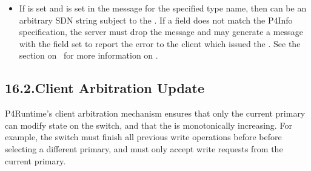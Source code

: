 \documentclass[11pt]{article}
\begin{document}
{\begin{itemize}
\begin{itemize}[noitemsep,topsep=\mdcompacttopsep]
\item{}If  is set and
 is set in the
 message for the specified type name, then
 can be an arbitrary SDN string subject to the
.
If a  field
does not match the P4Info specification, the server must drop the 
message and may generate a  message with the 
field set to report the error to the client which issued the . See
the section on~ for more
information on .%
\end{itemize}%
\end{itemize}%

\subsection{16.2.\hspace*{0.5em}Client Arbitration Update}\label{sec-client-arbitration-update}%

\noindent{}P4Runtime's client arbitration mechanism ensures that only the current primary
can modify state on the switch, and that the  is monotonically
increasing. For example, the switch must finish all previous write operations
before before selecting a different primary, and must only accept write requests
from the current primary.%

}
\end{document}
